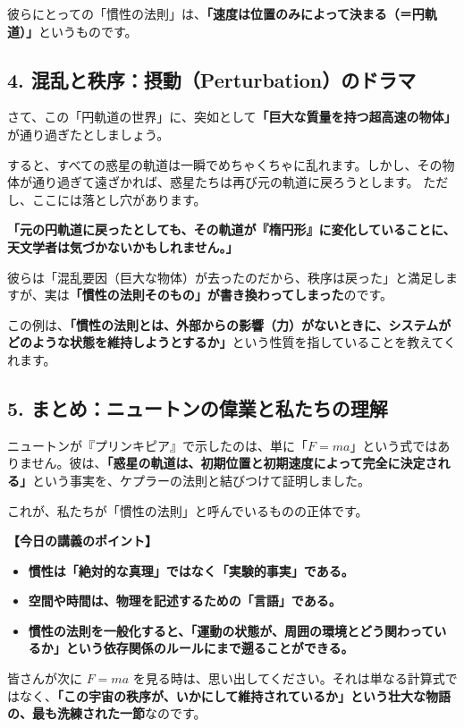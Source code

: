 \documentclass[a4paper,11pt,openany]{ltjsbook}
\begin{document}
\begin{lecturebox}
彼らにとっての「慣性の法則」は、\textbf{「速度は位置のみによって決まる（＝円軌道）」}というものです。

\subsection*{4. 混乱と秩序：摂動（Perturbation）のドラマ}

さて、この「円軌道の世界」に、突如として\textbf{「巨大な質量を持つ超高速の物体」}が通り過ぎたとしましょう。

すると、すべての惑星の軌道は一瞬でめちゃくちゃに乱れます。しかし、その物体が通り過ぎて遠ざかれば、惑星たちは再び元の軌道に戻ろうとします。
ただし、ここには落とし穴があります。

\textbf{「元の円軌道に戻ったとしても、その軌道が『楕円形』に変化していることに、天文学者は気づかないかもしれません。」}

彼らは「混乱要因（巨大な物体）が去ったのだから、秩序は戻った」と満足しますが、実は\textbf{「慣性の法則そのもの」が書き換わってしまった}のです。

この例は、\textbf{「慣性の法則とは、外部からの影響（力）がないときに、システムがどのような状態を維持しようとするか」}という性質を指していることを教えてくれます。

\subsection*{5. まとめ：ニュートンの偉業と私たちの理解}

ニュートンが『プリンキピア』で示したのは、単に「$F=ma$」という式ではありません。彼は、\textbf{「惑星の軌道は、初期位置と初期速度によって完全に決定される」}という事実を、ケプラーの法則と結びつけて証明しました。

これが、私たちが「慣性の法則」と呼んでいるものの正体です。

\textbf{【今日の講義のポイント】}
\begin{itemize}[leftmargin=2em]
\item \textbf{慣性は「絶対的な真理」ではなく「実験的事実」である。}
\item \textbf{空間や時間は、物理を記述するための「言語」である。}
\item \textbf{慣性の法則を一般化すると、「運動の状態が、周囲の環境とどう関わっているか」という依存関係のルールにまで遡ることができる。}
\end{itemize}

皆さんが次に $F=ma$ を見る時は、思い出してください。それは単なる計算式ではなく、\textbf{「この宇宙の秩序が、いかにして維持されているか」という壮大な物語の、最も洗練された一節}なのです。


\end{lecturebox}
\end{document}
